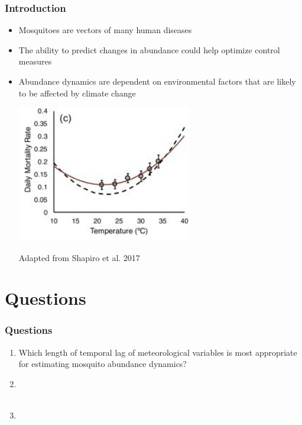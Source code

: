 \documentclass{beamer}
\begin{document}
\begin{frame}{}
\frametitle{Introduction}
\begin{itemize}
	\item Mosquitoes are vectors of many human diseases 
	\item The ability to predict changes in abundance could help optimize control measures
	\item Abundance dynamics are dependent on environmental factors that are likely to be affected by climate change
	
	\includegraphics[width= 0.6\textwidth]{tpc.jpg}
	
	\footnotesize Adapted from Shapiro et al. 2017
	
\end{itemize}

\end{frame}

\section{Questions}
\begin{frame}
\frametitle{Questions}

\begin{enumerate}\Large
	\item Which length of temporal lag of meteorological variables is most appropriate for estimating mosquito abundance dynamics? \vspace{.3cm}
	
	\item \textcolor{white}{Which temporal scale of environmental drivers best predicts mosquito abundance changes?} \vspace{.3cm}
	
	\item \textcolor{white}{Can a model developed from these questions predict West Nile Virus risk?}
	\vspace{1cm}
	
\end{enumerate}

\end{frame}
\end{document}
